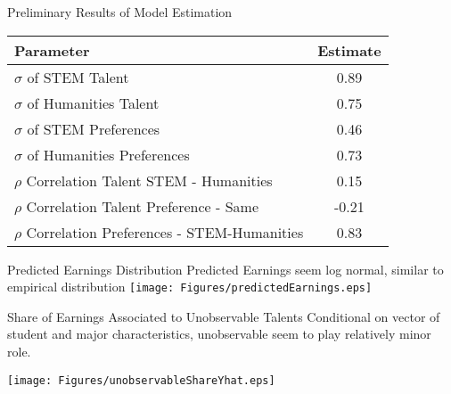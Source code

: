 \documentclass[table,10pt]{beamer}
\begin{document}
\begin{frame}{Preliminary Results of Model Estimation}

\begin{center}
	\begin{tabular}{lc}
		\hline\hline
		\textbf{Parameter} & \textbf{Estimate} \\
		\hline
$\sigma$ of STEM Talent                                     &  0.89\\
$\sigma$ of Humanities Talent                               & 0.75\\
$\sigma$ of STEM Preferences                                &  0.46\\
$\sigma$ of Humanities Preferences                         &  0.73\\
		\hline
$\rho$ Correlation Talent STEM - Humanities                            &  0.15\\
$\rho$ Correlation Talent Preference - Same                            & -0.21\\
$\rho$ Correlation Preferences - STEM-Humanities                       &  0.83\\ 
		\hline\hline
	\end{tabular}
\end{center}
\end{frame}

\begin{frame}{Predicted Earnings Distribution}
Predicted Earnings seem log normal, similar to empirical distribution
   \centering
  \texttt{[image: Figures/predictedEarnings.eps]}
\end{frame}

\begin{frame}{Share of Earnings Associated to Unobservable Talents}
 Conditional on vector of student and major characteristics, unobservable seem to play relatively minor role. 
  
  \centering
  \texttt{[image: Figures/unobservableShareYhat.eps]}


\end{frame}
\end{document}
